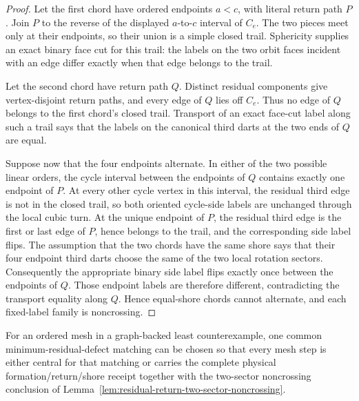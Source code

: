 \begin{proof}
Let the first chord have ordered endpoints \(a<c\), with literal return path
\(P\).  Join \(P\) to the reverse of the displayed \(a\)-to-\(c\) interval of
\(C_e\).  The two pieces meet only at their endpoints, so their union is a
simple closed trail.  Sphericity supplies an exact binary face cut for this
trail: the labels on the two orbit faces incident with an edge differ exactly
when that edge belongs to the trail.

Let the second chord have return path \(Q\).  Distinct residual components
give vertex-disjoint return paths, and every edge of \(Q\) lies off
\(C_e\).  Thus no edge of \(Q\) belongs to the first chord's closed trail.
Transport of an exact face-cut label along such a trail says that the labels
on the canonical third darts at the two ends of \(Q\) are equal.

Suppose now that the four endpoints alternate.  In either of the two possible
linear orders, the cycle interval between the endpoints of \(Q\) contains
exactly one endpoint of \(P\).  At every other cycle vertex in this interval,
the residual third edge is not in the closed trail, so both oriented
cycle-side labels are unchanged through the local cubic turn.  At the unique
endpoint of \(P\), the residual third edge is the first or last edge of
\(P\), hence belongs to the trail, and the corresponding side label flips.
The assumption that the two chords have the same shore says that their four
endpoint third darts choose the same of the two local rotation sectors.
Consequently the appropriate binary side label flips exactly once between
the endpoints of \(Q\).  Those endpoint labels are therefore different,
contradicting the transport equality along \(Q\).  Hence equal-shore chords
cannot alternate, and each fixed-label family is noncrossing.
\end{proof}

\begin{corollary}
\label{cor:global-two-sector-residual-receipt}
For an ordered mesh in a graph-backed least counterexample, one common
minimum-residual-defect matching can be chosen so that every mesh step is
either central for that matching or carries the complete physical
formation/return/shore receipt together with the two-sector noncrossing
conclusion of Lemma~\ref{lem:residual-return-two-sector-noncrossing}.
\end{corollary}

